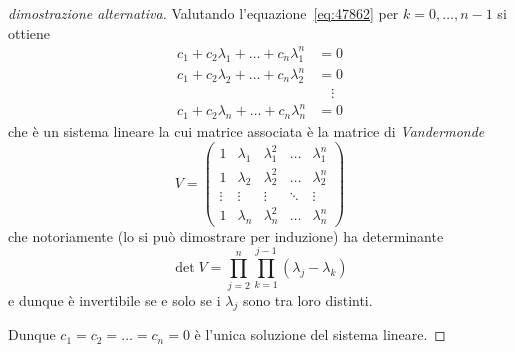 \begin{proof}[dimostrazione alternativa]
Valutando l'equazione~\eqref{eq:47862} per $k=0,\dots, n-1$ si ottiene
\begin{align*}
  c_1 + c_2 \lambda_1 + \dots + c_n \lambda_1^n & = 0 \\
  c_1 + c_2 \lambda_2 + \dots + c_n \lambda_2^n & = 0 \\
  &\quad \vdots\\
  c_1 + c_2 \lambda_n + \dots + c_n \lambda_n^n & = 0
\end{align*}
che è un sistema lineare la cui matrice associata è
la matrice di \emph{Vandermonde}%
%
\[
V =
\begin{pmatrix}
  1 & \lambda_1 & \lambda_1^2 & \dots & \lambda_1^n \\
  1 & \lambda_2 & \lambda_2^2 & \dots & \lambda_2^n \\
  \vdots & \vdots & \vdots & \ddots & \vdots \\
  1 & \lambda_n & \lambda_n^2 & \dots & \lambda_n^n
\end{pmatrix}
\]
che notoriamente (lo si può dimostrare per induzione)
ha determinante
\[
  \det V = \prod_{j=2}^{n} \prod_{k=1}^{j-1}(\lambda_j-\lambda_k)
\]
e dunque
è invertibile se e solo se
i $\lambda_j$ sono tra loro distinti.

Dunque $c_1 = c_2 = \dots = c_n = 0$ è l'unica soluzione
del sistema lineare.
\end{proof}


